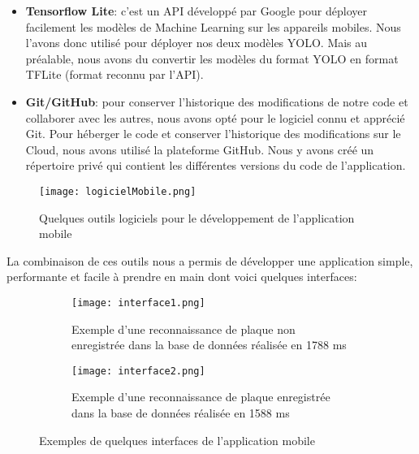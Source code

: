 \begin{itemize}
        \item \textbf{Tensorflow Lite}: c'est un API développé par Google pour déployer facilement les modèles de Machine Learning sur les appareils mobiles. Nous l'avons donc utilisé pour déployer nos deux modèles YOLO. Mais au préalable, nous avons du convertir les modèles du format YOLO en format TFLite (format reconnu par l'API).
        
        \item \textbf{Git/GitHub}: pour conserver l’historique des modifications de notre code et collaborer avec les autres, nous avons opté pour le logiciel connu et apprécié Git. Pour héberger le code et conserver l’historique des modifications sur le Cloud, nous avons utilisé la plateforme GitHub. Nous y avons créé un répertoire privé qui contient les différentes versions du code de l’application.
    \end{itemize}
    \begin{figure}
        \centering
        \texttt{[image: logicielMobile.png]}
        \caption{Quelques outils logiciels pour le développement de l'application mobile}
    \end{figure}
La combinaison de ces outils nous a permis de développer une application simple, performante et facile à prendre en main dont voici quelques interfaces:
\begin{figure}[H]
    \begin{subfigure}{0.3\textwidth}
        \centering
        \texttt{[image: interface1.png]}
        \caption{Exemple d'une reconnaissance de plaque non enregistrée dans la base de données réalisée en 1788 ms}
    \end{subfigure}
    \hfill
    \begin{subfigure}{0.3\textwidth}
        \centering
        \texttt{[image: interface2.png]}
        \caption{Exemple d'une reconnaissance de plaque enregistrée dans la base de données réalisée en 1588 ms}
    \end{subfigure}
    \caption{Exemples de quelques interfaces de l'application mobile}
\end{figure}


